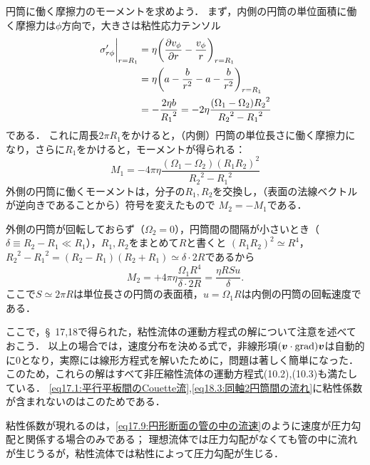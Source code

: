 円筒に働く摩擦力のモーメントを求めよう．
まず，内側の円筒の単位面積に働く摩擦力は$\phi$方向で，大きさは粘性応力テンソル
\begin{align*}
    \eval{\sigma_{r\phi}'}_{r=R_1} &= \eta \pqty{\pdv{v_\phi}{r}-\frac{v_\phi}{r}}_{r=R_1} \\
    &= \eta \pqty{ a-\frac{b}{r^2} -a-\frac{b}{r^2} }_{r=R_1} \\
    &= -\frac{2\eta b}{{R_1}^2} = -2\eta \frac{(\Omega_1-\Omega_2){R_2}^2}{{R_2}^2-{R_1}^2}
\end{align*}
である．
これに周長$2\pi R_1$をかけると，（内側）円筒の単位長さに働く摩擦力になり，さらに$R_1$をかけると，モーメントが得られる：
\begin{equation}
    M_1 = -4\pi\eta \frac{(\Omega_1-\Omega_2)(R_1R_2)^2}{{R_2}^2-{R_1}^2}
\end{equation}
外側の円筒に働くモーメントは，分子の$R_1,R_2$を交換し，（表面の法線ベクトルが逆向きであることから）符号を変えたもので
$M_2=-M_1$である．


\spade
外側の円筒が回転しておらず（$\Omega_2=0$），円筒間の間隔が小さいとき（$\delta\equiv R_2-R_1 \ll R_1$），$R_1,R_2$をまとめて$R$と書くと
$(R_1R_2)^2 \simeq R^4$，${R_2}^2-{R_1}^2 = (R_2-R_1)(R_2+R_1) \simeq \delta\cdot 2R$であるから
\[
    M_2 = + 4\pi\eta \frac{\Omega_1 R^4}{\delta \cdot 2R} = \frac{\eta R Su}{\delta} .
\]
ここで$S \simeq 2\pi R$は単位長さの円筒の表面積，$u=\Omega_1 R$は内側の円筒の回転速度である．



ここで，\S~17,18で得られた，粘性流体の運動方程式の解について注意を述べておこう．
以上の場合では，速度分布を決める式で，非線形項$(\vb*{v}\cdot\operatorname{grad})\vb*{v}$は自動的に0となり，実際には線形方程式を解いたために，問題は著しく簡単になった．
このため，これらの解はすべて非圧縮性流体の運動方程式(10.2),(10.3)も満たしている．
\eqref{eq17.1:平行平板間のCouette流},\eqref{eq18.3:同軸2円筒間の流れ}に粘性係数が含まれないのはこのためである．

粘性係数が現れるのは，\eqref{eq17.9:円形断面の管の中の流速}のように速度が圧力勾配と関係する場合のみである；
理想流体では圧力勾配がなくても管の中に流れが生じうるが，粘性流体では粘性によって圧力勾配が生じる．







\BackToTheToc